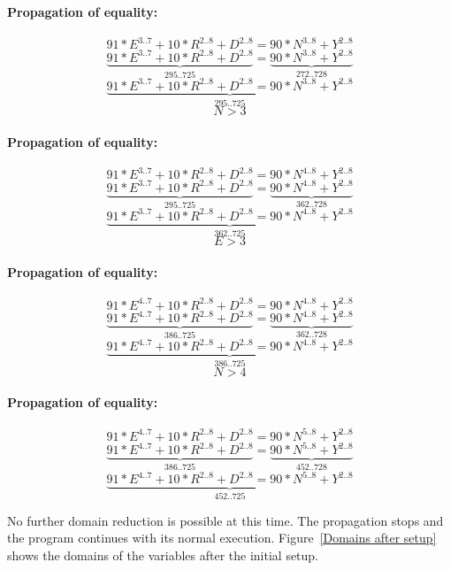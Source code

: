 \documentclass[a4paper]{article}
\begin{document}
\paragraph{Propagation of equality:}
\[
91*E^{3..7}+10*R^{2..8}+D^{2..8} = 90*N^{3..8}+Y^{2..8}
\]
\[
\underbrace{91*E^{3..7}+10*R^{2..8}+D^{2..8}}_{295..725} = \underbrace{90*N^{3..8}+Y^{2..8}}_{272..728}
\]
\[
\underbrace{91*E^{3..7}+10*R^{2..8}+D^{2..8} = 90*N^{3..8}+Y^{2..8}}_{295..725}
\]
\[
N > 3
\]

\paragraph{Propagation of equality:}

\[
91*E^{3..7}+10*R^{2..8}+D^{2..8} = 90*N^{4..8}+Y^{2..8}
\]
\[
\underbrace{91*E^{3..7}+10*R^{2..8}+D^{2..8}}_{295..725} = \underbrace{90*N^{4..8}+Y^{2..8}}_{362..728}
\]
\[
\underbrace{91*E^{3..7}+10*R^{2..8}+D^{2..8} = 90*N^{4..8}+Y^{2..8}}_{362..725}
\]
\[
E > 3
\]

\paragraph{Propagation of equality:}

\[
91*E^{4..7}+10*R^{2..8}+D^{2..8} = 90*N^{4..8}+Y^{2..8}
\]
\[
\underbrace{91*E^{4..7}+10*R^{2..8}+D^{2..8}}_{386..725} = \underbrace{90*N^{4..8}+Y^{2..8}}_{362..728}
\]
\[
\underbrace{91*E^{4..7}+10*R^{2..8}+D^{2..8} = 90*N^{4..8}+Y^{2..8}}_{386..725}
\]
\[
N > 4
\]

\paragraph{Propagation of equality:}

\[
91*E^{4..7}+10*R^{2..8}+D^{2..8} = 90*N^{5..8}+Y^{2..8}
\]
\[
\underbrace{91*E^{4..7}+10*R^{2..8}+D^{2..8}}_{386..725} = \underbrace{90*N^{5..8}+Y^{2..8}}_{452..728}
\]
\[
\underbrace{91*E^{4..7}+10*R^{2..8}+D^{2..8} = 90*N^{5..8}+Y^{2..8}}_{452..725}
\]

No further domain reduction is possible at this time. The propagation stops and the program continues with its normal execution. Figure~\ref{Domains after setup} shows the domains of the variables after the initial setup.
\end{document}
